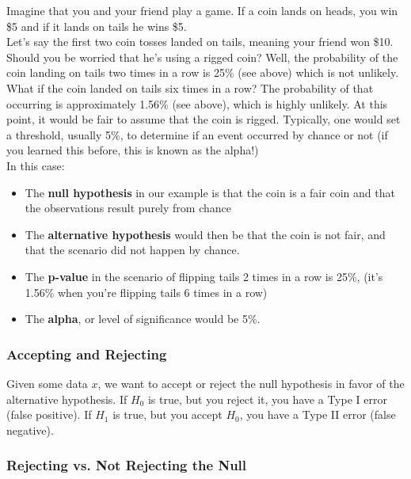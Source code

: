 \documentclass[english, 10pt]{article}
\begin{document}
\begin{myproof}
Imagine that you and your friend play a game. If a coin lands on heads, you win \$5 and if it lands on tails he wins \$5.\\

Let’s say the first two coin tosses landed on tails, meaning your friend won \$10. Should you be worried that he’s using a rigged coin? Well, the probability of the coin landing on tails two times in a row is 25\% (see above) which is not unlikely.\\

What if the coin landed on tails six times in a row? The probability of that occurring is approximately 1.56\% (see above), which is highly unlikely. At this point, it would be fair to assume that the coin is rigged. Typically, one would set a threshold, usually 5\%, to determine if an event occurred by chance or not (if you learned this before, this is known as the alpha!)\\

In this case:
\begin{itemize}
	\item The \textbf{null hypothesis} in our example is that the coin is a fair coin and that the observations result purely from chance
	\item The \textbf{alternative hypothesis} would then be that the coin is not fair, and that the scenario did not happen by chance.
	\item The \textbf{p-value} in the scenario of flipping tails 2 times in a row is 25\%, (it's 1.56\% when you're flipping tails 6 times in a row)
	\item The \textbf{alpha}, or level of significance would be 5\%.
\end{itemize}
\end{myproof}

\subsubsection{Accepting and Rejecting}

Given some data $x$, we want to accept or reject the null hypothesis in favor of the alternative hypothesis. If $H_0$ is true, but you reject it, you have a Type I error (false positive). If $H_1$ is true, but you accept $H_0$, you have a Type II error (false negative).\\

\subsubsection{Rejecting vs. Not Rejecting the Null}
\end{document}
